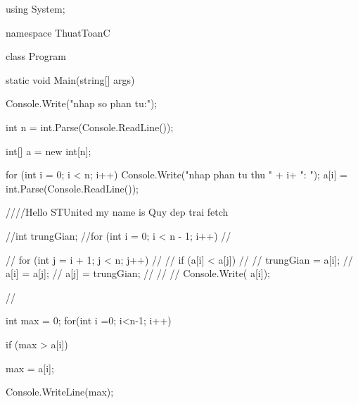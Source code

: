 using System;

namespace ThuatToanC
{
    class Program
    {
        static void Main(string[] args)
        {
            Console.Write("nhap so phan tu:");

            int n = int.Parse(Console.ReadLine());

            int[] a = new int[n];


            for (int i = 0; i < n; i++)
            {
                Console.Write("nhap phan tu thu " + i+ ": ");
                a[i] = int.Parse(Console.ReadLine());
            }

             ////Hello STUnited my name is Quy dep trai fetch

            //int trungGian;
            //for (int i = 0; i < n - 1; i++)
            //{
            //    for (int j = i + 1; j < n; j++)
            //    {
            //        if (a[i] < a[j])
            //        {
            //            trungGian = a[i];
            //            a[i] = a[j];
            //            a[j] = trungGian;
            //        }
            //    }
            //    Console.Write( a[i]);

            //}

             int max = 0;
            for(int i =0; i<n-1; i++)
            {
               
                if (max > a[i])
                {
                    max = a[i];
                    
                }
                Console.WriteLine(max);
            }

        }
    }
}
